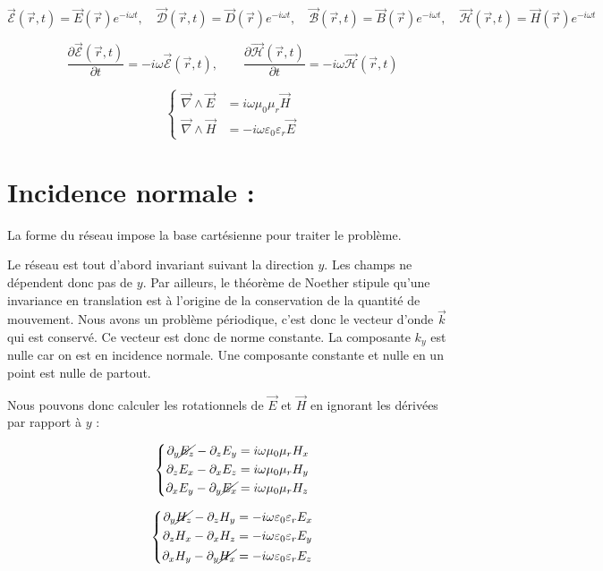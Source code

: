\documentclass{article}
\begin{document}
\[
\vec{\mathcal{E}}(\vec{r}, t) = \vec{E}(\vec{r}) e^{-i \omega t}, \quad
\vec{\mathcal{D}}(\vec{r}, t) = \vec{D}(\vec{r}) e^{-i \omega t}, \quad
\vec{\mathcal{B}}(\vec{r}, t) = \vec{B}(\vec{r}) e^{-i \omega t}, \quad
\vec{\mathcal{H}}(\vec{r}, t) = \vec{H}(\vec{r}) e^{-i \omega t}
\]

\[
\frac{\partial \vec{\mathcal{E}}(\vec{r}, t)}{\partial t} = -i \omega \vec{\mathcal{E}}(\vec{r}, t), \qquad
\frac{\partial \vec{\mathcal{H}}(\vec{r}, t)}{\partial t} = -i \omega \vec{\mathcal{H}}(\vec{r}, t)
\]

\[
\left\{
\begin{aligned}
\vec{\nabla} \wedge \vec{E} &= i \omega \mu_0 \mu_r \vec{H} \\
\vec{\nabla} \wedge \vec{H} &= - i \omega \varepsilon_0 \varepsilon_r \vec{E}
\end{aligned}
\right.
\]
\section*{Incidence normale : }
La forme du réseau impose la base cartésienne pour traiter le problème.

Le réseau est tout d'abord invariant suivant la direction \(y\). Les champs ne dépendent donc pas de \(y\). Par ailleurs, le théorème de Noether stipule qu'une invariance en translation est à l'origine de la conservation de la quantité de mouvement. Nous avons un problème périodique, c'est donc le vecteur d'onde \(\vec{k}\) qui est conservé. Ce vecteur est donc de norme constante. La composante \(k_y\) est nulle car on est en incidence normale. Une composante constante et nulle en un point est nulle de partout.

Nous pouvons donc calculer les rotationnels de \(\vec{E}\) et \(\vec{H}\) en ignorant les dérivées par rapport à \(y\) :

\[
\left\{
\begin{aligned}
\partial_y \cancel{E_z} - \partial_z E_y &= i \omega \mu_0 \mu_r H_x \\
\partial_z E_x - \partial_x E_z &= i \omega \mu_0 \mu_r H_y \\
\partial_x E_y - \partial_y \cancel{E_x} &= i \omega \mu_0 \mu_r H_z
\end{aligned}
\right.
\]

\[
\left\{
\begin{aligned}
\partial_y \cancel{H_z} - \partial_z H_y &= -i \omega \varepsilon_0 \varepsilon_r E_x \\
\partial_z H_x - \partial_x H_z &= -i \omega \varepsilon_0 \varepsilon_r E_y \\
\partial_x H_y - \partial_y \cancel{H_x} &= -i \omega \varepsilon_0 \varepsilon_r E_z
\end{aligned}
\right.
\]
\end{document}
